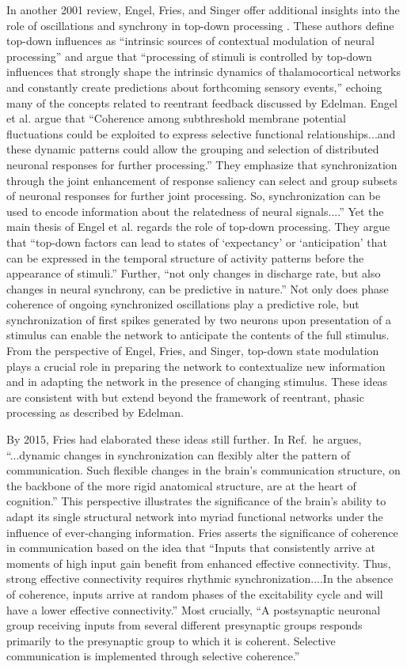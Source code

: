 In another 2001 review, Engel, Fries, and Singer offer additional insights into the role of oscillations and synchrony in top-down processing \cite{enfr2001}. These authors define top-down influences as ``intrinsic sources of contextual modulation of neural processing'' and argue that ``processing of stimuli is controlled by top-down influences that strongly shape the intrinsic dynamics of thalamocortical networks and constantly create predictions about forthcoming sensory events,'' echoing many of the concepts related to reentrant feedback discussed by Edelman. Engel et al. argue that ``Coherence among subthreshold membrane potential fluctuations could be exploited to express selective functional relationships...and these dynamic patterns could allow the grouping and selection of distributed neuronal responses for further processing.'' They emphasize that synchronization through the joint enhancement of response saliency can select and group subsets of neuronal responses for further joint processing. So, synchronization can be used to encode information about the relatedness of neural signals....'' Yet the main thesis of Engel et al. regards the role of top-down processing. They argue that ``top-down factors can lead to states of `expectancy' or `anticipation' that can be expressed in the temporal structure of activity patterns before the appearance of stimuli.'' Further, ``not only changes in discharge rate, but also changes in neural synchrony, can be predictive in nature.'' Not only does phase coherence of ongoing synchronized oscillations play a predictive role, but synchronization of first spikes generated by two neurons upon presentation of a stimulus can enable the network to anticipate the contents of the full stimulus. From the perspective of Engel, Fries, and Singer, top-down state modulation plays a crucial role in preparing the network to contextualize new information and in adapting the network in the presence of changing stimulus. These ideas are consistent with but extend beyond the framework of reentrant, phasic processing as described by Edelman.

By 2015, Fries had elaborated these ideas still further. In Ref.\,\cite{fr2015} he argues, ``...dynamic changes in synchronization can flexibly alter the pattern of communication. Such flexible changes in the brain's communication structure, on the backbone of the more rigid anatomical structure, are at the heart of cognition.'' This perspective illustrates the significance of the brain's ability to adapt its single structural network into myriad functional networks under the influence of ever-changing information. Fries asserts the significance of coherence in communication based on the idea that ``Inputs that consistently arrive at moments of high input gain benefit from enhanced effective connectivity. Thus, strong effective connectivity requires rhythmic synchronization....In the absence of coherence, inputs arrive at random phases of the excitability cycle and will have a lower effective connectivity.'' Most crucially, ``A postsynaptic neuronal group receiving inputs from several different presynaptic groups responds primarily to the presynaptic group to which it is coherent. Selective communication is implemented through selective coherence.''

